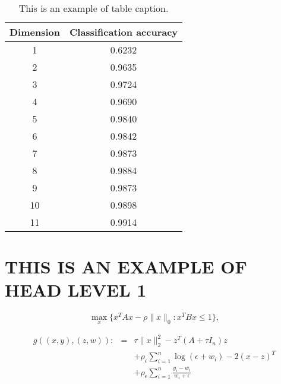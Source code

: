 \documentclass{pasa}
\begin{document}
\begin{table}
\caption{This is an example of table caption.}
\begin{center}
\begin{tabular}{@{}cc@{}}
\hline\hline
Dimension & Classification accuracy \\
\hline%
 1  & 0.6232 \\
 2  & 0.9635 \\ 
 3  & 0.9724 \\ 
 4  & 0.9690 \\ 
 5  & 0.9840 \\ 
 6  & 0.9842 \\ 
 7  & 0.9873 \\ 
 8  & 0.9884 \\
 9  & 0.9873 \\ 
 10 & 0.9898 \\ 
 11 & 0.9914 \\
\hline\hline
\end{tabular}
\end{center}
\label{tab1}
\end{table}

 
\section{THIS IS AN EXAMPLE OF HEAD LEVEL 1}


\begin{equation}\label{GEV}
\max\limits_{x}\{x^TAx-\rho \|x\|_0: x^TBx\leq 1\},
\end{equation}


\begin{eqnarray*}
	g((x,y),(z,w)):&=&\tau\|x\|_2^2-z^T(A+\tau I_n)z\\
	&&+\rho_\epsilon\sum\limits_{i=1}^n\log(\epsilon+w_i)-2(x-z)^T\\
	&&+\rho_\epsilon\sum\limits_{i=1}^n\frac{y_i-w_i}{w_i+\epsilon}
\end{eqnarray*}
\end{document}
